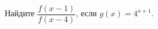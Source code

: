 \begin{ex}
	\begin{condition}
		Найдите \( \dfrac{f(x-1)}{f(x-4)} \), если \( g(x)=4^{x+1} \).
	\end{condition}
\end{ex}